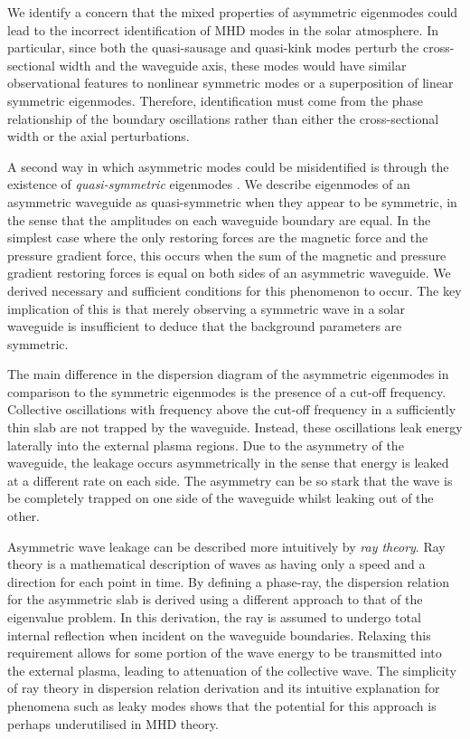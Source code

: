 We identify a concern that the mixed properties of asymmetric eigenmodes could lead to the incorrect identification of MHD modes in the solar atmosphere. In particular, since both the quasi-sausage and quasi-kink modes perturb the cross-sectional width and the waveguide axis, these modes would have similar observational features to nonlinear symmetric modes or a superposition of linear symmetric eigenmodes. Therefore, identification must come from the phase relationship of the boundary oscillations rather than either the cross-sectional width or the axial perturbations.

A second way in which asymmetric modes could be misidentified is through the existence of \textit{quasi-symmetric} eigenmodes \cite{zsa_etal18}. We describe eigenmodes of an asymmetric waveguide as quasi-symmetric when they appear to be symmetric, in the sense that the amplitudes on each waveguide boundary are equal. In the simplest case where the only restoring forces are the magnetic force and the pressure gradient force, this occurs when the sum of the magnetic and pressure gradient restoring forces is equal on both sides of an asymmetric waveguide. We derived necessary and sufficient conditions for this phenomenon to occur. The key implication of this is that merely observing a symmetric wave in a solar waveguide is insufficient to deduce that the background parameters are symmetric.

The main difference in the dispersion diagram of the asymmetric eigenmodes in comparison to the symmetric eigenmodes is the presence of a cut-off frequency. Collective oscillations with frequency above the cut-off frequency in a sufficiently thin slab are not trapped by the waveguide. Instead, these oscillations leak energy laterally into the external plasma regions. Due to the asymmetry of the waveguide, the leakage occurs asymmetrically in the sense that energy is leaked at a different rate on each side. The asymmetry can be so stark that the wave is be completely trapped on one side of the waveguide whilst leaking out of the other.

Asymmetric wave leakage can be described more intuitively by \textit{ray theory}. Ray theory is a mathematical description of waves as having only a speed and a direction for each point in time. By defining a phase-ray, the dispersion relation for the asymmetric slab is derived using a different approach to that of the eigenvalue problem. In this derivation, the ray is assumed to undergo total internal reflection when incident on the waveguide boundaries. Relaxing this requirement allows for some portion of the wave energy to be transmitted into the external plasma, leading to attenuation of the collective wave. The simplicity of ray theory in dispersion relation derivation and its intuitive explanation for phenomena such as leaky modes shows that the potential for this approach is perhaps underutilised in MHD theory.

